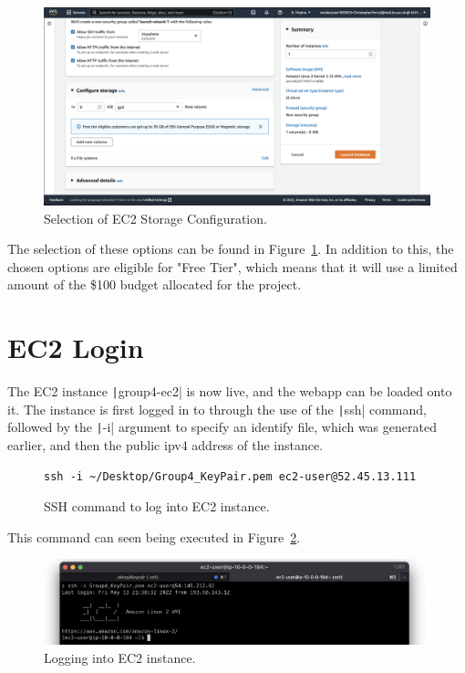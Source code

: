 \begin{figure}[!htbp]
    \centering
    \includegraphics[width=\textwidth]{resources/ec2/create-instance-configure-storage}
    \caption{Selection of EC2 Storage Configuration.}
    \label{fig:ec2-storage}
\end{figure}

The selection of these options can be found in Figure~\ref{fig:ec2-storage}.
In addition to this, the chosen options are eligible for "Free Tier", which means that it will use a limited amount of the
\$100 budget allocated for the project.

\clearpage

\section{EC2 Login}\label{sec:webapp-setup}

The EC2 instance \texttt|group4-ec2| is now live, and the webapp can be loaded onto it.
The instance is first logged in to through the use of the \texttt|ssh| command, followed by the
\texttt|-i| argument to specify an identify file, which was generated earlier, and then the public ipv4 address
of the instance.

\begin{figure}[!htbp]
    \centering
    \begin{verbatim}
ssh -i ~/Desktop/Group4_KeyPair.pem ec2-user@52.45.13.111
    \end{verbatim}
    \caption{SSH command to log into EC2 instance.}\label{fig:ssh-login}
\end{figure}

This command can seen being executed in Figure~\ref{fig:ssh-login}.

\begin{figure}[!htbp]
    \centering
    \includegraphics[width=\textwidth]{resources/ec2/ec2-logged-in}
    \caption{Logging into EC2 instance.}
    \label{fig:ec2-logged-in}
\end{figure}

